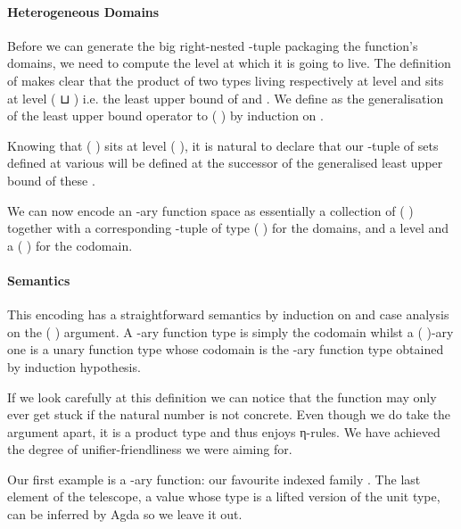 
\paragraph{Heterogeneous Domains} Before we can generate the big right-nested
-tuple packaging the function's domains, we need to compute the level at
which it is going to live. The definition of  makes clear that the product
of two types living respectively at level  and  sits at level
{( ⊔ )} i.e. the least upper bound of  and .
We define  as the generalisation of the least upper bound operator
to {( )} by induction on .


Knowing that {( )} sits at level {( )}, it is
natural to declare that our -tuple of sets defined at various 
will be defined at the successor of the generalised least upper bound of these
.


We can now encode an -ary function space as essentially a collection 
of {( )} together with a corresponding -tuple of type
{(  )} for the domains, and a level  and a
{( )} for the codomain.

\paragraph{Semantics}\label{sec:semantics}
This encoding has a straightforward semantics by induction on  and case
analysis on the {(  )} argument. A -ary function
type is simply the codomain whilst a {( )}-ary one is a unary
function type whose codomain is the -ary function type obtained by
induction hypothesis.


If we look carefully at this definition we can notice that the function
 may only ever get stuck if the natural number is not concrete.
Even though we do take the  argument apart, it is a product type
and thus enjoys η-rules. We have achieved the degree of unifier-friendliness
we were aiming for.

Our first example is a -ary function: our favourite indexed family .
The last element of the telescope, a value whose type is a lifted version of the
unit type, can be inferred by Agda so we leave it out.

